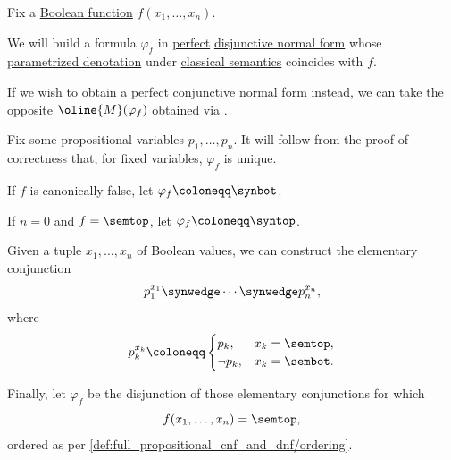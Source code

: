 \begin{algorithm}\label{alg:function_to_dnf}
  Fix a \hyperref[def:boolean_function]{Boolean function} \( f(x_1, \ldots, x_n) \).

  We will build a formula \( \varphi_f \) in \hyperref[def:full_propositional_cnf_and_dnf]{perfect} \hyperref[def:propositional_cnf_and_dnf]{disjunctive normal form} whose \hyperref[def:parametrized_propositional_denotation]{parametrized denotation} under \hyperref[def:truth_value_algebra/classical]{classical semantics} coincides with \( f \).

  If we wish to obtain a perfect conjunctive normal form instead, we can take the opposite \( \oline{M}(\varphi_f) \) obtained via .

  Fix some propositional variables \( p_1, \ldots, p_n \). It will follow from the proof of correctness that, for fixed variables, \( \varphi_f \) is unique.

  \begin{thmenum}
     If \( f \) is canonically false, let \( \varphi_f \coloneqq \synbot \).

     If \( n = 0 \) and \( f = \semtop \), let \( \varphi_f \coloneqq \syntop \).

     Given a tuple \( x_1, \ldots, x_n \) of Boolean values, we can construct the elementary conjunction
    \begin{equation}\label{alg:function_to_dnf/cnf}
      p_1^{x_1} \synwedge \cdots \synwedge p_n^{x_n},
    \end{equation}
    where
    \begin{equation*}
      p_k^{x_k} \coloneqq \begin{cases}
        p_k,      &x_k = \semtop, \\
        \neg p_k, &x_k = \sembot.
      \end{cases}
    \end{equation*}

     Finally, let \( \varphi_f \) be the disjunction of those elementary conjunctions for which
    \begin{equation*}
      f(x_1, \ldots, x_n) = \semtop,
    \end{equation*}
    ordered as per \cref{def:full_propositional_cnf_and_dnf/ordering}.
  \end{thmenum}
\end{algorithm}
